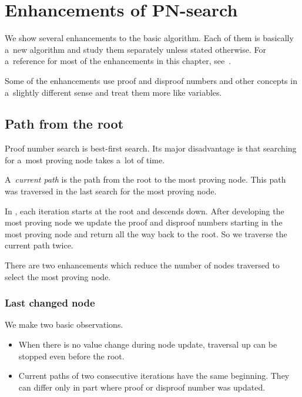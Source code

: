 \section{Enhancements of PN-search}

We show several enhancements to the basic  algorithm. Each
of them is basically a~new algorithm and study them separately
unless stated otherwise. For a~reference for most of the enhancements
in this chapter, see~\cite{allis}.

Some of the enhancements use proof and disproof numbers and other concepts
in a~slightly different sense and treat them more like variables. 

\subsection{Path from the root}

Proof number search is best-first search. Its major disadvantage is that
searching for a~most proving node takes a~lot of time. 

\begin{theorem}
	A~{\sl current path} is the path from the root to the most proving node.
	This path was traversed in the last search for the most proving node.
\end{theorem}

In , each iteration starts at the root and descends down. After developing
the most proving node we update the proof and disproof numbers starting in the most proving node and 
return all the way back to the root. So we traverse the current path twice. 

There are two enhancements which reduce the number of nodes traversed to select the
most proving node. 

\subsubsection{Last changed node} \label{last}

We make two basic observations.
\begin{itemize}
\item When there is no value change during node update, traversal up can be stopped even before the root.
\item Current paths of two consecutive iterations have the same beginning. They can differ
only in part where proof or disproof number was updated.
\end{itemize}

